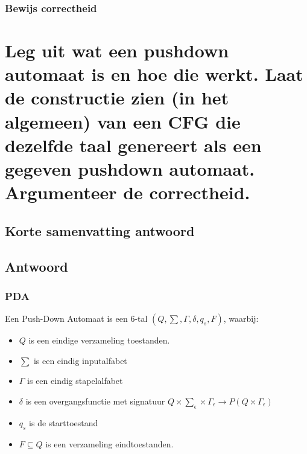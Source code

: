 \documentclass{article}
\begin{document}
        \subsubsection{Bewijs correctheid}
            


\newpage
\section{ Leg uit wat een pushdown automaat is en hoe die werkt. Laat de constructie zien (in het algemeen) van een CFG die dezelfde taal genereert als een gegeven pushdown automaat. Argumenteer de correctheid.}
    \subsection{Korte samenvatting antwoord}
        
    \subsection{Antwoord}
        \subsubsection{PDA}
            Een Push-Down Automaat is een 6-tal $(Q,\sum , \Gamma ,\delta , q_s, F)$, waarbij:
            \begin{itemize}
                \item $Q$ is een eindige verzameling toestanden.
                \item $\sum$ is een eindig inputalfabet
                \item $\Gamma$ is een eindig stapelalfabet
                \item $\delta$ is een overgangsfunctie met signatuur $Q \times \sum_{\epsilon} \times \Gamma_\epsilon \rightarrow P(Q \times \Gamma_\epsilon)$
                \item $q_s$ is de starttoestand
                \item $F \subseteq Q$ is een verzameling eindtoestanden.
            \end{itemize}
\end{document}

